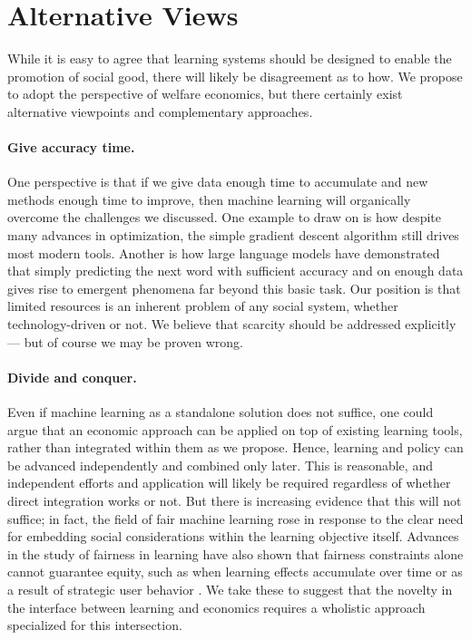 \section{Alternative Views} \label{sec:alt_views}
While it is easy to agree that learning systems should be designed to enable the promotion of social good, there will likely be disagreement as to how.
We propose to adopt the perspective of welfare economics,
but there certainly exist alternative viewpoints and complementary approaches.
\squeeze

\paragraph{Give accuracy time.}
One perspective is that if we give data enough time to accumulate and new methods enough time to improve, then machine learning will organically overcome the challenges we discussed.
One example to draw on is how despite many advances in optimization, the simple gradient descent algorithm still drives most modern tools.
Another is how large language models have demonstrated that simply predicting the next word with sufficient accuracy and on enough data 
gives rise to emergent phenomena far beyond this basic task.
Our position is that limited resources is an inherent problem of any social system, whether technology-driven or not.%
We believe that scarcity should be addressed explicitly---%
but of course we may be proven wrong.
\squeeze

\paragraph{Divide and conquer.}
Even if  machine learning as a standalone solution does not suffice,
one could argue that an economic approach can be applied on top of existing learning tools, rather than integrated within them as we propose.
Hence, learning and policy can be advanced independently and combined only later.
This is reasonable, and independent efforts and application will likely be required
regardless of whether direct integration works or not.
But there is increasing evidence that this will not suffice;
in fact, the field of fair machine learning rose in response to the clear need for embedding social considerations within the learning objective itself.
Advances in the study of fairness in learning have also shown that fairness constraints alone cannot guarantee equity,
such as when learning effects accumulate over time \citep[e.g.,][]{liu2018delayed}
or as a result of strategic user behavior
\citep{horowitz2024classification}.
We take these to suggest that the novelty in the interface between learning and economics requires a wholistic approach
specialized for this intersection.%
\squeeze

